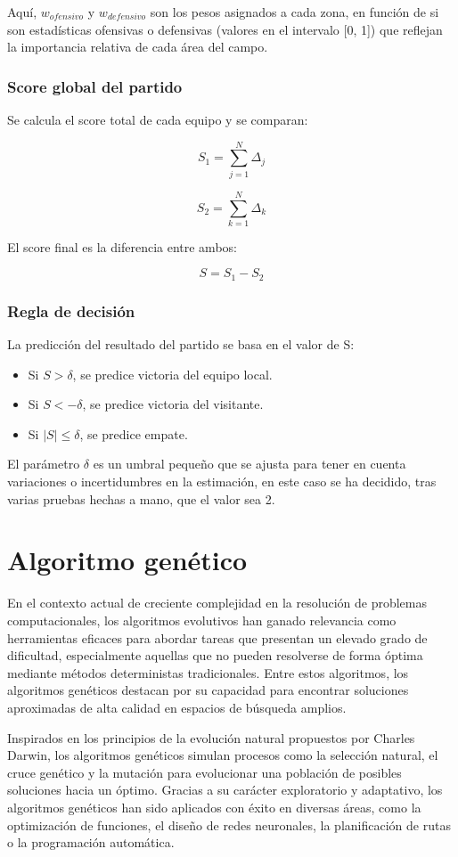 Aquí, $w_{ofensivo}$ y $w_{defensivo}$ son los pesos asignados a cada zona, en función de si son estadísticas ofensivas o defensivas (valores en el intervalo [0, 1]) que
reflejan la importancia relativa de cada área del campo.

\subsubsection*{Score global del partido}
Se calcula el score total de cada equipo y se comparan:

\[S_1 = \sum_{j=1}^{N} \Delta_j\] 

\[S_2 = \sum_{k=1}^{N} \Delta_k \]

El score final es la diferencia entre ambos:

\[ S = S_1 - S_2\]

\subsubsection*{Regla de decisión}
La predicción del resultado del partido se basa en el valor de S:
\begin{itemize}
    \item Si $S > \delta$, se predice victoria del equipo local.
    \item Si $S < -\delta$, se predice victoria del visitante.
    \item Si $|S| \leq \delta$, se predice empate.
\end{itemize}

El parámetro $\delta$ es un umbral pequeño que se ajusta para tener en cuenta variaciones o
incertidumbres en la estimación, en este caso se ha decidido, tras varias pruebas hechas a mano, que el valor sea 2.

\section{Algoritmo genético}
En el contexto actual de creciente complejidad en la resolución de problemas computacionales, los algoritmos evolutivos han ganado relevancia como herramientas eficaces para abordar tareas que presentan un elevado grado de dificultad, especialmente aquellas que no pueden resolverse de forma óptima mediante métodos deterministas tradicionales. Entre estos algoritmos, los algoritmos genéticos destacan por su capacidad para encontrar soluciones aproximadas de alta calidad en espacios de búsqueda amplios.

Inspirados en los principios de la evolución natural propuestos por Charles Darwin, los algoritmos genéticos simulan procesos como la selección natural, el cruce genético y la mutación para evolucionar una población de posibles soluciones hacia un óptimo. Gracias a su carácter exploratorio y adaptativo, los algoritmos genéticos han sido aplicados con éxito en diversas áreas, como la optimización de funciones, el diseño de redes neuronales, la planificación de rutas o la programación automática.

